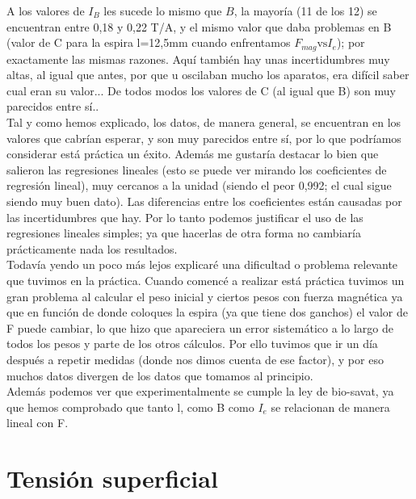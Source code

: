 \documentclass[12pt,a4paper]{book}
\begin{document}
A los valores de $I_B$ les sucede lo mismo que $B$, la mayoría (11 de los 12) se encuentran entre 0,18 y 0,22 T/A, y el mismo valor que daba problemas en B (valor de C para la espira l=12,5mm cuando enfrentamos $F_{mag} \mathrm{vs} I_e$); por exactamente las mismas razones. Aquí también hay  unas incertidumbres muy altas, al igual que antes, por que u oscilaban mucho los aparatos, era difícil saber cual eran su valor... De todos modos los valores de C (al igual que B) son muy parecidos entre sí.. \\

Tal y como hemos explicado, los datos, de manera general, se encuentran en los valores que cabrían esperar, y son muy parecidos entre sí, por lo que podríamos considerar está práctica un éxito. Además me gustaría destacar lo bien que salieron las regresiones lineales (esto se puede ver mirando los coeficientes de regresión lineal), muy cercanos a la unidad (siendo el peor 0,992; el cual sigue siendo muy buen dato). Las diferencias entre los coeficientes están causadas por las incertidumbres que hay. Por lo tanto podemos justificar el uso de las regresiones lineales simples; ya que hacerlas de otra forma no cambiaría prácticamente nada los resultados.\\

Todavía yendo un poco más lejos explicaré una dificultad o problema relevante que tuvimos en la práctica. Cuando comencé a realizar está práctica tuvimos un gran problema al calcular el peso inicial y ciertos pesos con fuerza magnética ya que en función de donde coloques la espira (ya que tiene dos ganchos) el valor de F puede cambiar, lo que hizo que apareciera un error sistemático a lo largo de todos los pesos y parte de los otros cálculos. Por ello tuvimos que ir un día después a repetir medidas (donde nos dimos cuenta de ese factor), y por eso muchos datos divergen de los datos que tomamos al principio. \\

Además podemos ver que experimentalmente se cumple la ley de bio-savat, ya que hemos comprobado que tanto l, como B como $I_e$ se relacionan de manera lineal con F. 










\chapter{Tensión superficial} \newpage
\end{document}
